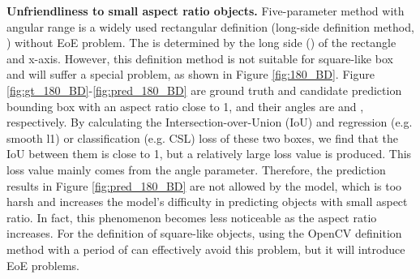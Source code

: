 \documentclass[final]{cvpr}
\begin{document}
\begin{table}[tb!]
	\centering
		\vspace{-6pt}
	\caption{Comparison of GFlops and Param over rotation detectors, under the same setting and hyperparameters.}
	\label{table:flops_param}
	\vspace{-10pt}
\end{table}


\textbf{Unfriendliness to small aspect ratio objects.} 
Five-parameter method with  angular range is a widely used rectangular definition (long-side definition method, ) without EoE problem. The  is determined by the long side () of the rectangle and x-axis. However, this definition method is not suitable for square-like box and will suffer a special problem, as shown in Figure \ref{fig:180_BD}. Figure \ref{fig:gt_180_BD}-\ref{fig:pred_180_BD} are ground truth and candidate prediction bounding box with an aspect ratio close to 1, and their angles are  and , respectively. By calculating the Intersection-over-Union (IoU) and regression (e.g. smooth l1) or classification (e.g. CSL) loss of these two boxes, we find that the IoU between them is close to 1, but a relatively large loss value is produced. This loss value mainly comes from the angle parameter. Therefore, the prediction results in Figure \ref{fig:pred_180_BD} are not allowed by the model, which is too harsh and increases the model's difficulty in predicting objects with small aspect ratio. In fact, this phenomenon becomes less noticeable as the aspect ratio increases. For the definition of square-like objects, using the OpenCV definition method with a period of  can effectively avoid this problem, but it will introduce EoE problems.
    
\end{document}
